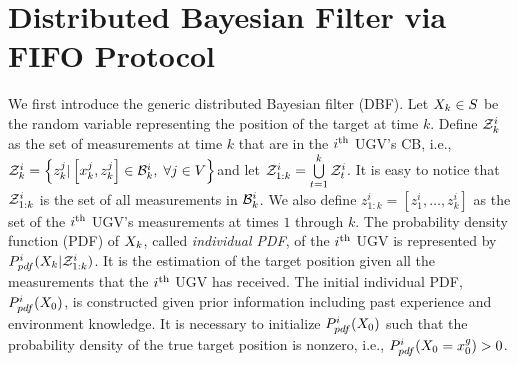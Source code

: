 \section{Distributed Bayesian Filter via FIFO Protocol}\label{sec:\proto-dbf}
	We first introduce the generic distributed Bayesian filter (DBF).
	Let $X_k\in S$ be the random variable representing the position of the target at time $k$.
	Define $\mathcal{Z}^i_k$ as the set of measurements at time $k$ that are in the $i^\text{th}$ UGV's CB, i.e., \small$\mathcal{Z}^i_k=\left\lbrace z^j_k| \left[x^j_k,z^j_k\right]\in \mathcal{B}^i_k,\; \forall j\in V\right\rbrace$\normalsize and let $\mathcal{Z}^i_{1:k} = \bigcup\limits_{t=1}^k \mathcal{Z}^i_t$. 
	\textcolor{\revcol}{It is easy to notice that $\mathcal{Z}^i_{1:k}$ is the set of all measurements in $\mathcal{B}^i_k$.}
	We also define $z^i_{1:k}=\left[z^i_1,\dots,z^i_k\right]$ as the set of the $i^\text{th}$ UGV's measurements at times $1$ through $k$.
	The probability density function (PDF) of $X_k$, called \textit{individual PDF}, of the $i^\text{th}$ UGV is represented by
	$P^i_{pdf}(X_{k}|\mathcal{Z}^i_{1:k})$.
	It is the estimation of the target position given all the measurements that the $i^\text{th}$ UGV has received.	
	The initial individual PDF, $P^i_{pdf}(X_0)$, is constructed %
	given prior information including past experience and environment knowledge. 
	It is necessary to initialize $P^i_{pdf}(X_0)$ such that the probability density of the true target position is nonzero, i.e., $P^i_{pdf}(X_0=x^g_0)> 0$.
	
